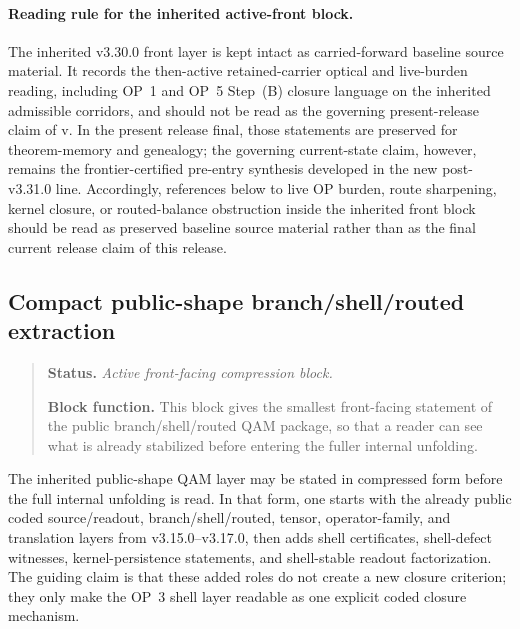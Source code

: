 \paragraph{Reading rule for the inherited active-front block.}
The inherited v3.30.0 front layer is kept intact as carried-forward baseline source material. It records the then-active retained-carrier optical and live-burden reading, including OP~1 and OP~5 Step~(B) closure language on the inherited admissible corridors, and should not be read as the governing present-release claim of v\docversion. In the present release final, those statements are preserved for theorem-memory and genealogy; the governing current-state claim, however, remains the frontier-certified pre-entry synthesis developed in the new post-v3.31.0 line. Accordingly, references below to live OP burden, route sharpening, kernel closure, or routed-balance obstruction inside the inherited front block should be read as preserved baseline source material rather than as the final current release claim of this release.

\subsection*{Compact public-shape branch/shell/routed extraction}
\begin{quote}\small
\noindent\textbf{Status.} \emph{Active front-facing compression block.}\par
\noindent\textbf{Block function.} This block gives the smallest front-facing statement of the public branch/shell/routed QAM package, so that a reader can see what is already stabilized before entering the fuller internal unfolding.
\end{quote}
The inherited public-shape QAM layer may be stated in compressed form before the full internal unfolding is read. In that form, one starts with the already public coded source/readout, branch/shell/routed, tensor, operator-family, and translation layers from v3.15.0--v3.17.0, then adds shell certificates, shell-defect witnesses, kernel-persistence statements, and shell-stable readout factorization. The guiding claim is that these added roles do not create a new closure criterion; they only make the OP~3 shell layer readable as one explicit coded closure mechanism.


